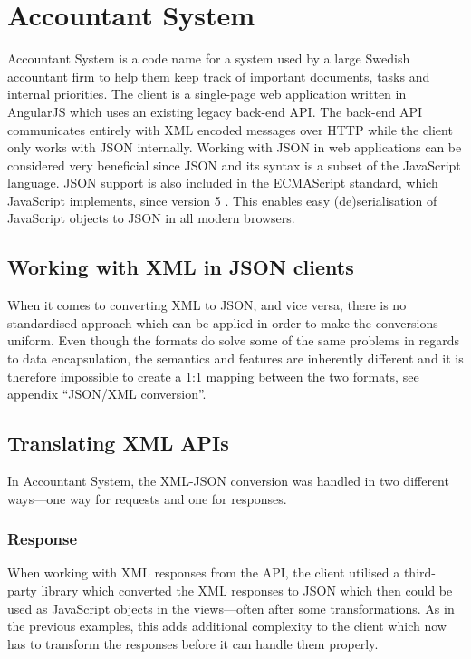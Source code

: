 \documentclass{cslthse-msc}
\begin{document}
\section{Accountant System}

Accountant System is a code name for a system used by a large Swedish accountant firm to help them keep track of important documents, tasks and internal priorities. The client is a single-page web application written in AngularJS which uses an existing legacy back-end API. The back-end API communicates entirely with XML encoded messages over HTTP while the client only works with JSON internally. Working with JSON in web applications can be considered very beneficial since JSON and its syntax is a subset of the JavaScript language. JSON support is also included in the ECMAScript standard, which JavaScript implements, since version 5 \cite{ecmascript_5}. This enables easy (de)serialisation of JavaScript objects to JSON in all modern browsers.

\subsection{Working with XML in JSON clients}
\label{xml_json}

When it comes to converting XML to JSON, and vice versa, there is no standardised approach which can be applied in order to make the conversions uniform. Even though the formats do solve some of the same problems in regards to data encapsulation, the semantics and features are inherently different and it is therefore impossible to create a 1:1 mapping between the two formats, see appendix \enquote{JSON/XML conversion}.


\subsection{Translating XML APIs}
In Accountant System, the XML-JSON conversion was handled in two different ways---one way for requests and one for responses.

\subsubsection{Response}

When working with XML responses from the API, the client utilised a third-party library which converted the XML responses to JSON which then could be used as JavaScript objects in the views---often after some transformations. As in the previous examples, this adds additional complexity to the client which now has to transform the responses before it can handle them properly.
\end{document}
